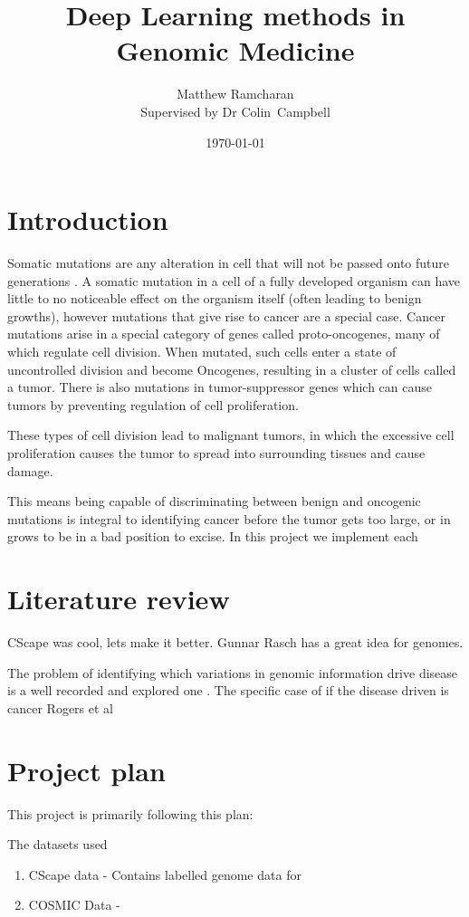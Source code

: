 \documentclass[11pt]{article}
\title{Deep Learning methods in Genomic Medicine}
\author{Matthew Ramcharan \\ Supervised by Dr Colin\ Campbell}
\date{\today}
\begin{document}
\maketitle

\section{Introduction}

Somatic mutations are any alteration in cell that will not be passed onto future generations \cite{Griffiths2000}. A somatic mutation in a cell of a fully developed organism can have little to no noticeable effect on the organism itself (often leading to benign growths), however mutations that give rise to cancer are a special case. Cancer mutations arise in a special category of genes called proto-oncogenes, many of which regulate cell division. When mutated, such cells enter a state of uncontrolled division and become Oncogenes, resulting in a cluster of cells called a tumor.  There is also mutations in tumor-suppressor genes which can cause tumors by preventing regulation of cell proliferation.

These types of cell division lead to malignant tumors, in which the excessive cell proliferation causes the tumor to spread into surrounding tissues and cause damage. 

This means being capable of discriminating between benign and oncogenic mutations is integral to identifying cancer before the tumor gets too large, or in grows to be in a bad position to excise. In this project we implement each 


\section{Literature review}
CScape was cool, lets make it better.
Gunnar Rasch has a great idea for genomes.

The problem of identifying which variations in genomic information drive disease is a well recorded and explored one \cite{Rogers2017,Quang2015,Shihab2013}. The specific case of if the disease driven is cancer
Rogers et al \cite{Rogers2017}


\section{Project plan}

This project is primarily following this plan:

The datasets used
\begin{enumerate}
	\item CScape data \cite{Rogers2017} - Contains labelled genome data for 
	\item COSMIC Data - 
\end{enumerate}
\end{document}
